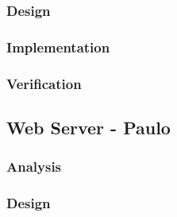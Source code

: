 \subsubsection{Design}
%
%
%
\subsubsection{Implementation}
%
%
\subsubsection{Verification}
%
%


\subsection{Web Server - Paulo}

%
%
\subsubsection{Analysis}
%
%
%
\subsubsection{Design}
%
%
%
